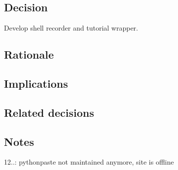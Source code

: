 \subsection*{Decision}

Develop shell recorder and tutorial wrapper.

\subsection*{Rationale}

\subsection*{Implications}

\subsection*{Related decisions}

\subsection*{Notes}


\begin{DoxyItemize}
\item 12..\+: pythonpaste not maintained anymore, site is offline 
\end{DoxyItemize}